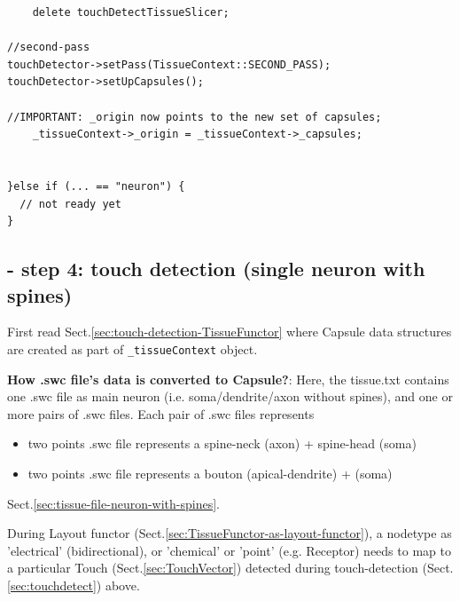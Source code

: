 {\begin{lstlisting}
    delete touchDetectTissueSlicer;

//second-pass
touchDetector->setPass(TissueContext::SECOND_PASS);
touchDetector->setUpCapsules();

//IMPORTANT: _origin now points to the new set of capsules;
    _tissueContext->_origin = _tissueContext->_capsules;


}else if (... == "neuron") {
  // not ready yet
}
\end{lstlisting}
}



% 

\subsection{- step 4: touch detection (single neuron with spines)}

First read Sect.\ref{sec:touch-detection-TissueFunctor} where Capsule data
structures are created as part of \verb!_tissueContext! object.

{\bf How .swc file's data is converted to Capsule?}: Here, the tissue.txt
contains one .swc file as main neuron (i.e. soma/dendrite/axon without spines),
and one or more pairs of .swc files. Each pair of .swc files represents
\begin{itemize}
  \item two points .swc file represents a spine-neck (axon) + spine-head (soma)
  
  \item two points .swc file represents a bouton (apical-dendrite) + (soma)
\end{itemize}
Sect.\ref{sec:tissue-file-neuron-with-spines}.

During Layout functor (Sect.\ref{sec:TissueFunctor-as-layout-functor}), a
nodetype as 'electrical' (bidirectional), or 'chemical' or 'point' (e.g.
Receptor) needs to map to a particular Touch (Sect.\ref{sec:TouchVector})
detected during touch-detection (Sect.\ref{sec:touchdetect}) above.

